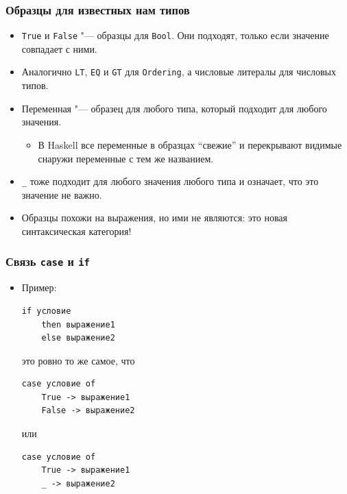 \documentclass[10pt]{beamer}
\begin{document}
\begin{frame}[fragile]
\frametitle{Образцы для известных нам типов}
\begin{itemize}
    \item \lstinline|True| и \lstinline|False| "--- образцы для \lstinline|Bool|. Они подходят, только если значение совпадает с ними.
    \item Аналогично \lstinline|LT|, \lstinline|EQ| и \lstinline|GT| для \lstinline|Ordering|, а числовые литералы для числовых типов.
    \item Переменная "--- образец для любого типа, который подходит для любого значения.
    \begin{itemize}
        \item В Haskell все переменные в образцах \enquote{свежие} и перекрывают видимые снаружи переменные с тем же названием.
    \end{itemize}
\item \lstinline|_| тоже подходит для любого значения любого типа и означает, что это значение не важно.
    \item Образцы похожи на выражения, но ими не являются: это новая синтаксическая категория!
\end{itemize}
\end{frame}

\begin{frame}[fragile]
\frametitle{Связь \lstinline[basicstyle=\ttfamily]|case| и \lstinline[basicstyle=\ttfamily]|if|}
\begin{itemize}
    \item Пример:
\begin{lstlisting}
if условие 
    then выражение1 
    else выражение2
\end{lstlisting}
это ровно то же самое, что
\begin{lstlisting}
case условие of
    True -> выражение1 
    False -> выражение2
\end{lstlisting}
или
\begin{lstlisting}
case условие of
    True -> выражение1 
    _ -> выражение2
\end{lstlisting}
\end{itemize}
\end{frame}
\end{document}
